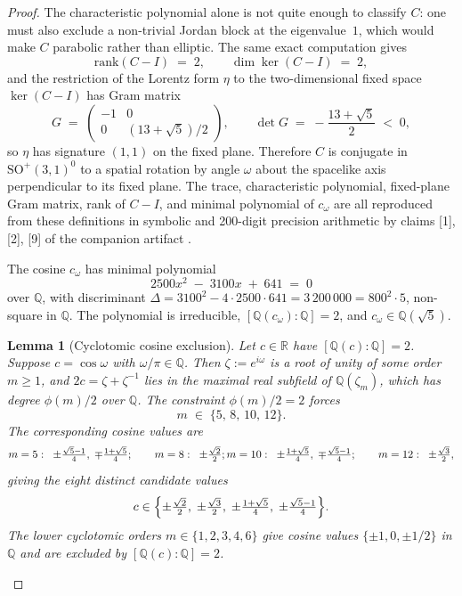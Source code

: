 \documentclass[11pt]{article}
\newtheorem{lemma}[theorem]{Lemma}
\theoremstyle{remark}
\begin{document}
\begin{proof}
The characteristic polynomial alone is not quite enough to classify
$C$: one must also exclude a non-trivial Jordan block at the
eigenvalue~$1$, which would make $C$ parabolic rather than elliptic.
The same exact computation gives
\[
  \mathrm{rank}(C - I) \;=\; 2, \qquad \dim\ker(C - I) \;=\; 2,
\]
and the restriction of the Lorentz form $\eta$ to the two-dimensional
fixed space $\ker(C - I)$ has Gram matrix
\[
  G \;=\; \begin{pmatrix}
    -1 & 0 \\ 0 & (13 + \sqrt{5})/2
  \end{pmatrix},
  \qquad
  \det G \;=\; -\frac{13 + \sqrt{5}}{2} \;<\; 0,
\]
so $\eta$ has signature $(1, 1)$ on the fixed plane. Therefore $C$
is conjugate in $\mathrm{SO}^+(3,1)^0$ to a spatial rotation by angle
$\omega$ about the spacelike axis perpendicular to its fixed plane.
The trace, characteristic polynomial, fixed-plane Gram matrix, rank
of $C - I$, and minimal polynomial of $c_\omega$ are all reproduced
from these definitions in symbolic and 200-digit precision arithmetic
by claims [1], [2], [9] of the companion artifact \cite{ALPCode}.

The cosine $c_\omega$ has minimal polynomial
\[
  2500 x^2 \;-\; 3100 x \;+\; 641 \;=\; 0
\]
over $\mathbb{Q}$, with discriminant
$\Delta = 3100^2 - 4 \cdot 2500 \cdot 641 = 3\,200\,000 = 800^2 \cdot 5$,
non-square in $\mathbb{Q}$. The polynomial is irreducible,
$[\mathbb{Q}(c_\omega) : \mathbb{Q}] = 2$, and $c_\omega \in
\mathbb{Q}(\sqrt{5})$.

\begin{lemma}[Cyclotomic cosine exclusion]\label{lem:cce}
Let $c \in \mathbb{R}$ have $[\mathbb{Q}(c) : \mathbb{Q}] = 2$.
Suppose $c = \cos\omega$ with $\omega / \pi \in \mathbb{Q}$. Then
$\zeta := e^{i\omega}$ is a root of unity of some order $m \geq 1$,
and $2c = \zeta + \zeta^{-1}$ lies in the maximal real subfield of
$\mathbb{Q}(\zeta_m)$, which has degree $\phi(m)/2$ over
$\mathbb{Q}$. The constraint $\phi(m)/2 = 2$ forces
\[
  m \;\in\; \{5,\,8,\,10,\,12\}.
\]
The corresponding cosine values are
\[
  m = 5: \;\;\pm\tfrac{\sqrt{5}-1}{4},\; \mp\tfrac{1+\sqrt{5}}{4}; \qquad
  m = 8: \;\;\pm\tfrac{\sqrt{2}}{2}; \\
  m = 10: \;\;\pm\tfrac{1+\sqrt{5}}{4},\; \mp\tfrac{\sqrt{5}-1}{4}; \qquad
  m = 12: \;\;\pm\tfrac{\sqrt{3}}{2},
\]
giving the eight distinct candidate values
\[
  c \in \Bigl\{\pm\tfrac{\sqrt{2}}{2},\; \pm\tfrac{\sqrt{3}}{2},\;
    \pm\tfrac{1+\sqrt{5}}{4},\; \pm\tfrac{\sqrt{5}-1}{4}\Bigr\}.
\]
The lower cyclotomic orders $m \in \{1, 2, 3, 4, 6\}$ give cosine
values $\{\pm 1, 0, \pm 1/2\}$ in $\mathbb{Q}$ and are excluded by
$[\mathbb{Q}(c) : \mathbb{Q}] = 2$.
\end{lemma}


\end{proof}
\end{document}
